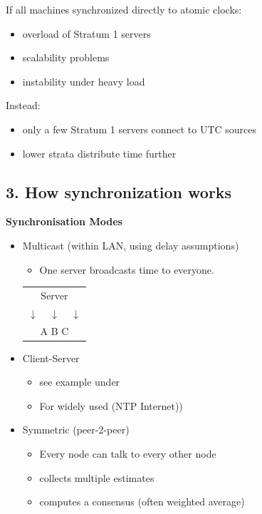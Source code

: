 If all machines synchronized directly to atomic clocks:

\begin{itemize}
    \item overload of Stratum 1 servers
    \item scalability problems
    \item instability under heavy load
\end{itemize}

Instead:

\begin{itemize}
    \item only a few Stratum 1 servers connect to UTC sources
    \item lower strata distribute time further
\end{itemize}



\subsection{3. How synchronization works}
\begin{mdframed}[backgroundcolor=lightgray, linewidth=0pt, innertopmargin=8pt,
innerbottommargin=8pt]
\textbf{Synchronisation Modes}
\begin{itemize}
    \item Multicast (within LAN, using delay assumptions)
    \begin{itemize}
        \item One server broadcasts time to everyone.
    \end{itemize}
    \begin{center}
\begin{tabular}{c}
Server \\
$\downarrow \;\;\;\;\downarrow \;\;\;\;\downarrow$ \\
A \;\;\;\;\;\;\;\; B \;\;\;\;\;\;\;\; C
\end{tabular}
\end{center}
    \item  Client-Server 
    \begin{itemize}
        \item see example under
        \item For widely used (NTP Internet))
    \end{itemize}
    \item Symmetric (peer-2-peer) 
    \begin{itemize}
        \item Every node can talk to every other node 
        \item collects multiple estimates
        \item computes a consensus (often weighted average)
    \end{itemize}
\end{itemize}
\end{mdframed}
